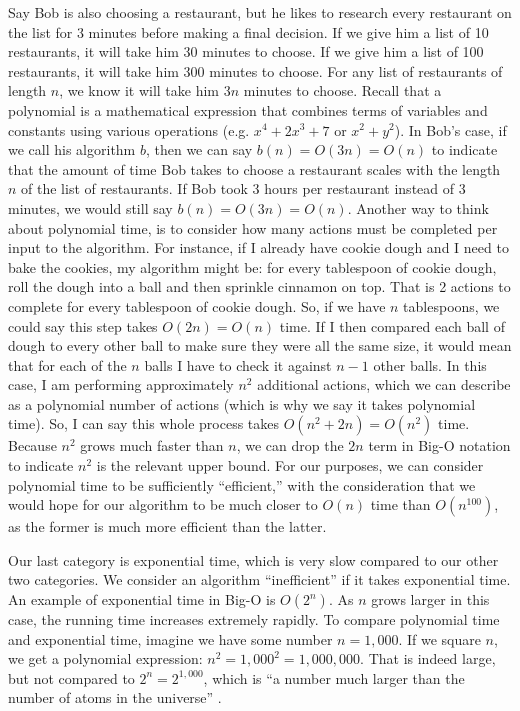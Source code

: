 Say Bob is also choosing a restaurant, but he likes to research every restaurant
on the list for 3 minutes before making a final decision. If we give him a list
of 10 restaurants, it will take him 30 minutes to choose. If we give him a list
of 100 restaurants, it will take him 300 minutes to choose. For any list of
restaurants of length $n$, we know it will take him $3n$ minutes to choose.
Recall that a polynomial is a mathematical expression that combines terms of
variables and constants using various operations (e.g. $x^4 + 2x^3 + 7$ or $x^2
+ y^2$). In Bob's case, if we call his algorithm $b$, then we can say $b(n) =
O(3n) = O(n)$ to indicate that the amount of time Bob takes to choose a restaurant
scales with the length $n$ of the list of restaurants. If Bob took 3 hours per
restaurant instead of 3 minutes, we would still say $b(n) = O(3n) = O(n)$. Another way to
think about polynomial time, is to consider how many
actions must be completed per input to the algorithm. For instance, if I already
have cookie dough and I need to bake the cookies, my algorithm might be: for
every tablespoon of cookie dough, roll the dough into a ball and then sprinkle
cinnamon on top. That is 2 actions to complete for every tablespoon of cookie
dough. So, if we have $n$ tablespoons, we could say this step takes $O(2n) =
O(n)$ time. If I then compared each ball of dough to every other ball to make sure
they were all the same size, it would mean that for each of the $n$ balls I
have to check it against 
$n - 1$ other balls. In this case, I am performing approximately $n^2$ additional actions, which
we can describe as a polynomial number of actions (which is why we say it takes
polynomial time). So, I can say this whole process takes $O(n^2 + 2n) = O(n^2)$
time.
Because $n^2$ grows much faster than $n$, we can drop the $2n$ term in Big-O notation
to indicate $n^2$ is the relevant upper bound. 
For our purposes, we can consider polynomial
time to be sufficiently “efficient,” with the consideration that we would hope
for our algorithm to be much closer to $O(n)$ time than $O(n^{100})$, as the
former is much more efficient than the latter.

Our last category is exponential
time, which is very slow compared to our other two categories. We consider an
algorithm “inefficient” if it takes exponential time. An example of exponential
time in Big-O is $O(2^n)$. As $n$ grows larger in this case, the running time
increases extremely rapidly. To compare polynomial time and exponential time,
imagine we have some number $n = 1,000$. If we square $n$, we get a polynomial
expression: $n^2 = 1,000^2 = 1,000,000$. That is indeed large, but not compared to
$2^n = 2^{1,000}$,
which is “a number much larger than the number of atoms in the universe”
\cite{Sipser_2006}.

